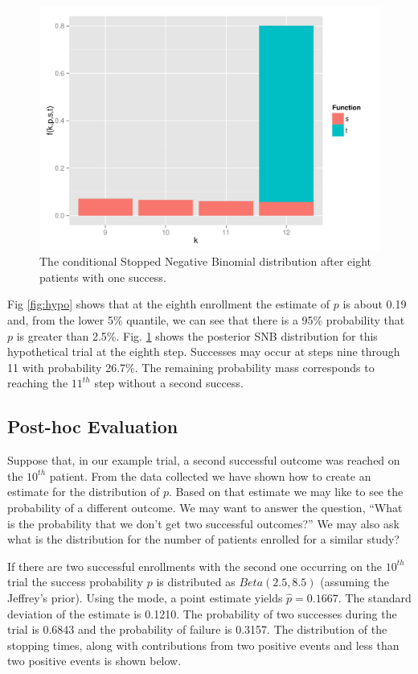 \documentclass[12pt]{article}         %
\begin{document}
\begin{figure}[ht]
\includegraphics[width=\textwidth]{conditional_snb.pdf}
\caption{
The conditional Stopped Negative Binomial distribution after eight patients with one success.
}
\label{fig:conditional_snb}
\end{figure}

Fig \ref{fig:hypo} shows that at the eighth enrollment the estimate of $p$ is 
about 0.19 and, from the lower 5\% quantile, we can see that there is
a 95\% probability that $p$ is greater than 2.5\%. 
Fig. \ref{fig:conditional_snb} shows the posterior SNB distribution for this 
hypothetical trial at the eighth step.  Successes may occur 
at steps nine through 11 with probability 26.7\%. The remaining probability
mass corresponds to reaching the $11^{th}$ step without a second success.

\subsection{Post-hoc Evaluation}

Suppose that, in our example trial, a second successful outcome was reached 
on the $10^{th}$ patient. From the data collected we have shown how to create 
an estimate for the distribution of $p$. Based on that estimate we may like to 
see the probability of a different outcome. We may want to answer the
question, ``What is the probability that we don't get two successful outcomes?''
We may also ask what is the distribution for the number of patients 
enrolled for a similar study?

If there are two successful enrollments with the second one occurring 
on the $10^{th}$ trial the success probability $p$ is distributed as 
$Beta(2.5, 8.5)$ (assuming the Jeffrey's prior). 
Using the mode, a point estimate yields $\hat{p} = 0.1667$. The standard 
deviation of the estimate is 0.1210. The probability of two successes during 
the trial is 0.6843 and the probability of failure is 0.3157. The distribution 
of the stopping times, along with contributions from two positive events and 
less than two positive events is shown below.
\end{document}
